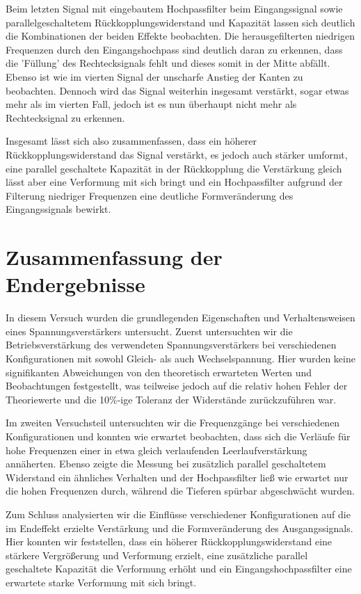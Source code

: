 \documentclass{article}
\begin{document}
Beim letzten Signal mit eingebautem Hochpassfilter beim Eingangssignal sowie parallelgeschaltetem Rückkopplungswiderstand und Kapazität lassen sich deutlich die Kombinationen der beiden Effekte beobachten. Die herausgefilterten niedrigen Frequenzen durch den Eingangshochpass sind deutlich daran zu erkennen, dass die 'Füllung' des Rechtecksignals fehlt und dieses somit in der Mitte abfällt. Ebenso ist wie im vierten Signal der unscharfe Anstieg der Kanten zu beobachten. Dennoch wird das Signal weiterhin insgesamt verstärkt, sogar etwas mehr als im vierten Fall, jedoch ist es nun überhaupt nicht mehr als Rechtecksignal zu erkennen. 

Insgesamt lässt sich also zusammenfassen, dass ein höherer Rückkopplungswiderstand das Signal verstärkt, es jedoch auch stärker umformt, eine parallel geschaltete Kapazität in der Rückkopplung die Verstärkung gleich lässt aber eine Verformung mit sich bringt und ein Hochpassfilter aufgrund der Filterung niedriger Frequenzen eine deutliche Formveränderung des Eingangssignals bewirkt. 






\clearpage
\newpage
\section{Zusammenfassung der Endergebnisse}

In diesem Versuch wurden die grundlegenden Eigenschaften und Verhaltensweisen eines Spannungsverstärkers untersucht. Zuerst untersuchten wir die Betriebsverstärkung des verwendeten Spannungsverstärkers bei verschiedenen Konfigurationen mit sowohl Gleich- als auch Wechselspannung. Hier wurden keine signifikanten Abweichungen von den theoretisch erwarteten Werten und Beobachtungen festgestellt, was teilweise jedoch auf die relativ hohen Fehler der Theoriewerte und die 10\%-ige Toleranz der Widerstände zurückzuführen war.

Im zweiten Versuchsteil untersuchten wir die Frequenzgänge bei verschiedenen Konfigurationen und konnten wie erwartet beobachten, dass sich die Verläufe für hohe Frequenzen einer in etwa gleich verlaufenden Leerlaufverstärkung annäherten. Ebenso zeigte die Messung bei zusätzlich parallel geschaltetem Widerstand ein ähnliches Verhalten und der Hochpassfilter ließ wie erwartet nur die hohen Frequenzen durch, während die Tieferen spürbar abgeschwächt wurden. 

Zum Schluss analysierten wir die Einflüsse verschiedener Konfigurationen auf die im Endeffekt erzielte Verstärkung und die Formveränderung des Ausgangssignals. Hier konnten wir feststellen, dass ein höherer Rückkopplungswiderstand eine stärkere Vergrößerung und Verformung erzielt, eine zusätzliche parallel geschaltete Kapazität die Verformung erhöht und ein Eingangshochpassfilter eine erwartete starke Verformung mit sich bringt. 
\end{document}
